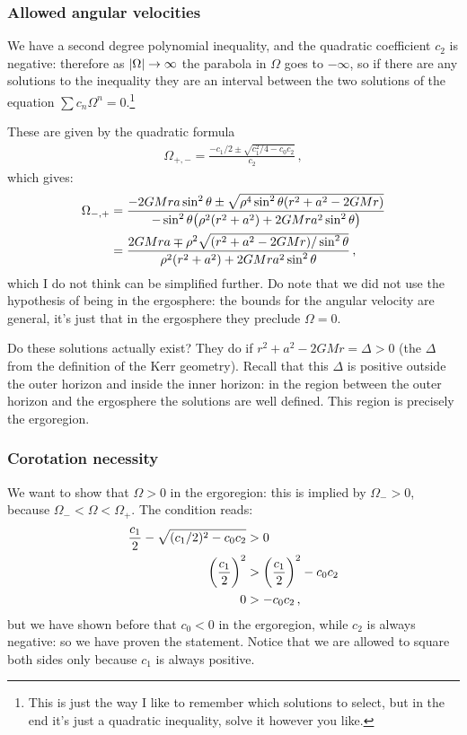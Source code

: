 \documentclass[main.tex]{subfiles}
\begin{document}
\subsubsection{Allowed angular velocities}

We have a second degree polynomial inequality, and the quadratic coefficient \(c_2 \) is negative: therefore as \(\abs{\Omega } \rightarrow \infty \) the parabola in \(\Omega \) goes to \(- \infty \), so if there are any solutions to the inequality they are an interval between the two solutions of the equation \(\sum c_{n} \Omega^{n} = 0\).\footnote{This is just the way I like to remember which solutions to select, but in the end it's just a quadratic inequality, solve it however you like.}

These are given by the quadratic formula 
%
\begin{align}
  \Omega_{+, -} = \frac{- c_1/2 \pm \sqrt{c_1^2/4- c_0 c_2  }}{c_2 }
\,,
\end{align}
%
which gives: 
%
\begin{align}
\Omega_{-,+} &= \frac{-2GMra \sin^2\theta \pm \sqrt{\rho^4 \sin^{2}\theta \qty(r^2+a^2-2GMr)}}{- \sin^2\theta \qty(\rho^2(r^2+a^2)+2GMra^2 \sin^2\theta )}  \\
&= \frac{2GMra \mp \rho^2 \sqrt{ \qty(r^2+a^2-2GMr) / \sin^2 \theta }}{\rho^2(r^2+a^2)+2GMra^2 \sin^2\theta }
\,,
\end{align}
%
which I do not think can be simplified further. 
Do note that we did not use the hypothesis of being in the ergosphere: the bounds for the angular velocity are general, it's just that in the ergosphere they preclude \(\Omega = 0\). 

Do these solutions actually exist? They do if \(r^2+a^2-2GMr = \Delta >0\) (the \(\Delta \) from the definition of the Kerr geometry). Recall that this \(\Delta \) is positive outside the outer horizon and inside the inner horizon: in the region between the outer horizon and the ergosphere the solutions are well defined. 
This region is precisely the ergoregion. 

\subsubsection{Corotation necessity}

We want to show that \(\Omega>0\) in the ergoregion: this is implied by \(\Omega_{-} > 0\), because \(\Omega_{-} < \Omega < \Omega_{+}\). The condition reads: 
%
\begin{align}
\frac{c_1}{2} - \sqrt{(c_1 /2)^2 - c_0 c_2 } &> 0  \\
\qty(\frac{c_1}{2})^2 &> \qty(\frac{c_1}{2})^2 - c_0 c_2   \\
0 &> -c_0 c_2 
\,,
\end{align}
%
but we have shown before that \(c_0 < 0\) in the ergoregion, while \(c_2 \) is always negative: so we have proven the statement. Notice that we are allowed to square both sides only because \(c_1 \) is always positive. 
\end{document}
